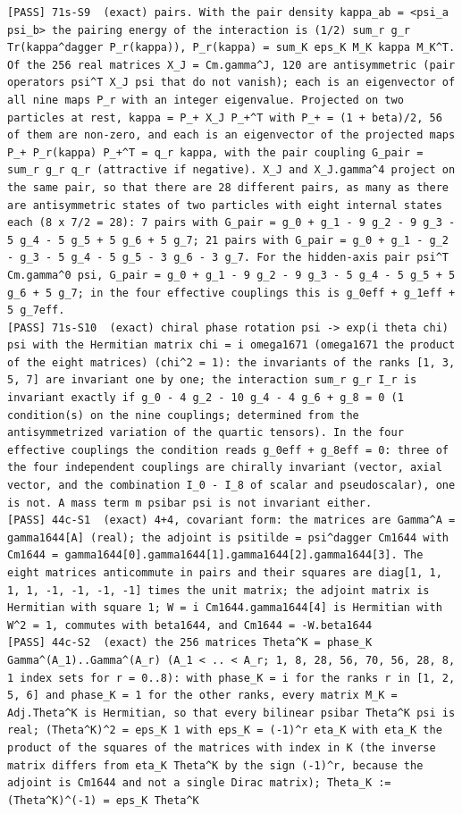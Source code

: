 \documentclass[
  10pt,
]{article}
\begin{document}
\begin{verbatim}
[PASS] 71s-S9  (exact) pairs. With the pair density kappa_ab = <psi_a psi_b> the pairing energy of the interaction is (1/2) sum_r g_r Tr(kappa^dagger P_r(kappa)), P_r(kappa) = sum_K eps_K M_K kappa M_K^T. Of the 256 real matrices X_J = Cm.gamma^J, 120 are antisymmetric (pair operators psi^T X_J psi that do not vanish); each is an eigenvector of all nine maps P_r with an integer eigenvalue. Projected on two particles at rest, kappa = P_+ X_J P_+^T with P_+ = (1 + beta)/2, 56 of them are non-zero, and each is an eigenvector of the projected maps P_+ P_r(kappa) P_+^T = q_r kappa, with the pair coupling G_pair = sum_r g_r q_r (attractive if negative). X_J and X_J.gamma^4 project on the same pair, so that there are 28 different pairs, as many as there are antisymmetric states of two particles with eight internal states each (8 x 7/2 = 28): 7 pairs with G_pair = g_0 + g_1 - 9 g_2 - 9 g_3 - 5 g_4 - 5 g_5 + 5 g_6 + 5 g_7; 21 pairs with G_pair = g_0 + g_1 - g_2 - g_3 - 5 g_4 - 5 g_5 - 3 g_6 - 3 g_7. For the hidden-axis pair psi^T Cm.gamma^0 psi, G_pair = g_0 + g_1 - 9 g_2 - 9 g_3 - 5 g_4 - 5 g_5 + 5 g_6 + 5 g_7; in the four effective couplings this is g_0eff + g_1eff + 5 g_7eff.
[PASS] 71s-S10  (exact) chiral phase rotation psi -> exp(i theta chi) psi with the Hermitian matrix chi = i omega1671 (omega1671 the product of the eight matrices) (chi^2 = 1): the invariants of the ranks [1, 3, 5, 7] are invariant one by one; the interaction sum_r g_r I_r is invariant exactly if g_0 - 4 g_2 - 10 g_4 - 4 g_6 + g_8 = 0 (1 condition(s) on the nine couplings; determined from the antisymmetrized variation of the quartic tensors). In the four effective couplings the condition reads g_0eff + g_8eff = 0: three of the four independent couplings are chirally invariant (vector, axial vector, and the combination I_0 - I_8 of scalar and pseudoscalar), one is not. A mass term m psibar psi is not invariant either.
[PASS] 44c-S1  (exact) 4+4, covariant form: the matrices are Gamma^A = gamma1644[A] (real); the adjoint is psitilde = psi^dagger Cm1644 with Cm1644 = gamma1644[0].gamma1644[1].gamma1644[2].gamma1644[3]. The eight matrices anticommute in pairs and their squares are diag[1, 1, 1, 1, -1, -1, -1, -1] times the unit matrix; the adjoint matrix is Hermitian with square 1; W = i Cm1644.gamma1644[4] is Hermitian with W^2 = 1, commutes with beta1644, and Cm1644 = -W.beta1644
[PASS] 44c-S2  (exact) the 256 matrices Theta^K = phase_K Gamma^(A_1)..Gamma^(A_r) (A_1 < .. < A_r; 1, 8, 28, 56, 70, 56, 28, 8, 1 index sets for r = 0..8): with phase_K = i for the ranks r in [1, 2, 5, 6] and phase_K = 1 for the other ranks, every matrix M_K = Adj.Theta^K is Hermitian, so that every bilinear psibar Theta^K psi is real; (Theta^K)^2 = eps_K 1 with eps_K = (-1)^r eta_K with eta_K the product of the squares of the matrices with index in K (the inverse matrix differs from eta_K Theta^K by the sign (-1)^r, because the adjoint is Cm1644 and not a single Dirac matrix); Theta_K := (Theta^K)^(-1) = eps_K Theta^K

\end{verbatim}
\end{document}
